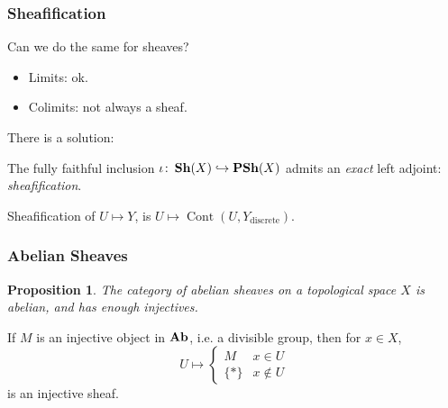 \documentclass{beamer}
\newtheorem{proposition}{Proposition}
\DeclareMathOperator{\Cont}{Cont}
\begin{document}
\begin{frame}
    \frametitle{Sheafification}

    \begin{center}
        Can we do the same for sheaves?
    \end{center}
    \pause
    \begin{itemize}
        \item Limits: ok.
        \item Colimits: not always a sheaf.
    \end{itemize}
    There is a solution:
    \pause
    \begin{theorem}
        The fully faithful inclusion $\iota \colon \operatorname{\mathbf{Sh}}(X) \hookrightarrow \operatorname{\mathbf{PSh}}(X)$
        admits an \emph{exact} left adjoint: \emph{sheafification}.
    \end{theorem}
    \begin{example}
        Sheafification of $U \mapsto Y$, is $U \mapsto \Cont(U, Y_{\text{discrete}})$.
    \end{example}

\end{frame}

\begin{frame}
    \frametitle{Abelian Sheaves}

    \begin{proposition}
        The category of abelian sheaves on a topological space $X$
        is abelian, and has enough injectives.
    \end{proposition}

    \begin{example}
        If $M$ is an injective object in $\operatorname{\mathbf{Ab}}$, i.e. a divisible group,
        then for $x\in X$,
        \begin{equation*}
            U \mapsto
            \begin{cases}
                M     & x \in U    \\
                \{*\} & x \notin U
            \end{cases}
        \end{equation*}
        is an injective sheaf.
    \end{example}

\end{frame}
\end{document}
